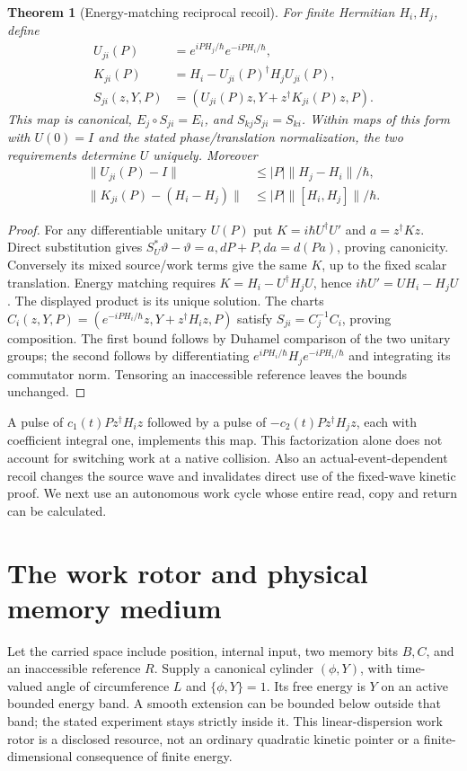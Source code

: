 \documentclass[11pt,oneside,openany]{book}
\newtheorem{theorem}{Theorem}[chapter]
\theoremstyle{definition}
\theoremstyle{remark}\newtheorem{remark}[theorem]{Remark}
\begin{document}
\begin{theorem}[Energy-matching reciprocal recoil]\label{acc:recoil}
For finite Hermitian $H_i,H_j$, define
\begin{align}
 U_{ji}(P)&=e^{iPH_j/\hbar}e^{-iPH_i/\hbar},\nonumber\\
 K_{ji}(P)&=H_i-U_{ji}(P)^\dagger H_jU_{ji}(P),\nonumber\\
 S_{ji}(z,Y,P)&=(U_{ji}(P)z,Y+z^\dagger K_{ji}(P)z,P).
 \label{acc:recoilmap}
\end{align}
This map is canonical, $E_j\circ S_{ji}=E_i$, and
$S_{kj}S_{ji}=S_{ki}$. Within maps of this form with $U(0)=I$ and the
stated phase/translation normalization, the two requirements determine
$U$ uniquely. Moreover
\begin{align}
 \|U_{ji}(P)-I\|&\le |P|\|H_j-H_i\|/\hbar,\nonumber\\
 \|K_{ji}(P)-(H_i-H_j)\|
 &\le |P|\|[H_i,H_j]\|/\hbar.
 \label{acc:recoilbound}
\end{align}
\end{theorem}
\begin{proof}
For any differentiable unitary $U(P)$ put $K=i\hbar U^\dagger U'$ and
$a=z^\dagger Kz$. Direct substitution gives
$S_U^*\vartheta-\vartheta=a,dP+P,da=d(Pa)$, proving canonicity.
Conversely its mixed source/work terms give the same $K$, up to the
fixed scalar translation. Energy matching requires
$K=H_i-U^\dagger H_jU$, hence
$i\hbar U'=UH_i-H_jU$. The displayed product is its unique solution.
The charts
$C_i(z,Y,P)=(e^{-iPH_i/\hbar}z,Y+z^\dagger H_i z,P)$ satisfy
$S_{ji}=C_j^{-1}C_i$, proving composition.
The first bound follows by Duhamel comparison of the two unitary groups;
the second follows by differentiating
$e^{iPH_i/\hbar}H_je^{-iPH_i/\hbar}$ and integrating its commutator norm.
Tensoring an inaccessible reference leaves the bounds unchanged.
\end{proof}

A pulse of $c_1(t)Pz^\dagger H_i z$ followed by a pulse of
$-c_2(t)Pz^\dagger H_jz$, each with coefficient integral one, implements
this map. This factorization alone does not account for switching work
at a native collision. Also an actual-event-dependent recoil changes
the source wave and invalidates direct use of the fixed-wave kinetic
proof. We next use an autonomous work cycle whose entire read, copy and
return can be calculated.

\section{The work rotor and physical memory medium}
Let the carried space include position, internal input, two memory bits
$B,C$, and an inaccessible reference $R$. Supply a canonical cylinder
$(\phi,Y)$, with time-valued angle of circumference $L$ and
$\{\phi,Y\}=1$. Its free energy is $Y$ on an active bounded energy band.
A smooth extension can be bounded below outside that band; the stated
experiment stays strictly inside it. This linear-dispersion work rotor
is a disclosed resource, not an ordinary quadratic kinetic pointer or
a finite-dimensional consequence of finite energy.
\end{document}
